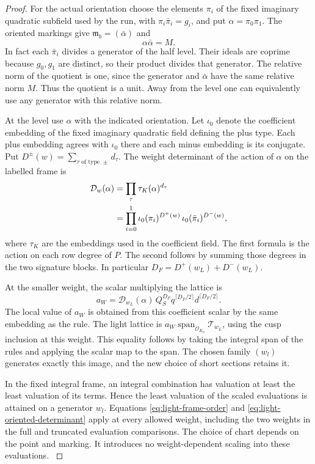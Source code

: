 \begin{proof}
For the actual orientation choose the elements \(\pi_i\) of
the fixed imaginary quadratic subfield used by the run, with
\(\pi_i\bar\pi_i=g_i\), and put \(\alpha=\pi_0\pi_1\).
The oriented markings give
\(\mathfrak m_b=(\bar\alpha)\) and 
\[
  \alpha\bar\alpha=M.
\]
In fact each \(\bar\pi_i\) divides a generator of the half
level. Their ideals are coprime because \(g_0,g_1\) are distinct,
so their product divides that generator. The relative norm of the
quotient is one, since the generator and \(\bar\alpha\) have the
same relative norm \(M\). Thus the quotient is a unit. Away
from the level one can equivalently use any generator with this
relative norm.

At the level use \(\alpha\) with the indicated
orientation. Let \(\iota_0\) denote the coefficient embedding of
the fixed imaginary quadratic field defining the plus type.
Each plus embedding agrees with \(\iota_0\) there and each
minus embedding is its conjugate. Put
\(D^\pm(w)=\sum_{\tau\text{ of type }\pm}d_\tau\). The weight
determinant of the action of \(\alpha\) on the labelled frame is
\begin{align}
 \mathcal D_w(\alpha)
     &=\prod_\tau\tau_K(\alpha)^{d_\tau} \notag\\
     &=\prod_{i=0}^1
         \iota_0(\pi_i)^{D^+(w)}\,
         \iota_0(\bar\pi_i)^{D^-(w)},
   \label{eq:light-oriented-determinant}
\end{align}
where \(\tau_K\) are the embeddings used in the coefficient
field. The first formula is the action on each row degree of
\(P\). The second follows by summing those degrees in the two
signature blocks. In particular \(D_F=D^+(w_L)+D^-(w_L)\).
\label{cor:slice-light-integral-4}

At the smaller weight, the scalar multiplying the lattice is
\begin{equation}\label{eq:light-global-scalar}
 a_W=\mathcal D_{w_L}(\alpha)\,
       Q_S^{D_F}q^{\lceil D_F/2\rceil}d^{\lceil D_F/2\rceil}.
\end{equation}
The local value of \(a_W\) is obtained from this coefficient
scalar by the same embedding as the rule. The light lattice is
\(a_W\operatorname{span}_{\mathcal O_{K_0}}\mathcal T_{w_L}\),
using the cusp inclusion at this weight. This equality follows
by taking the integral span of the rules and applying the scalar
map to the span. The chosen family \((w_l)\) generates exactly
this image, and the new choice of short sections retains it.

In the fixed integral frame, an integral combination has
valuation at least the least valuation of its terms. Hence the
least valuation of the scaled evaluations is attained on a generator \(w_l\). Equations \eqref{eq:light-frame-order}
and \eqref{eq:light-oriented-determinant} apply at every allowed
weight, including the two weights in the full and truncated
evaluation comparisons. The choice of chart depends on the
point and marking. It introduces no weight-dependent scaling
into these evaluations. \label{cor:slice-light-integral-5}
\end{proof}
